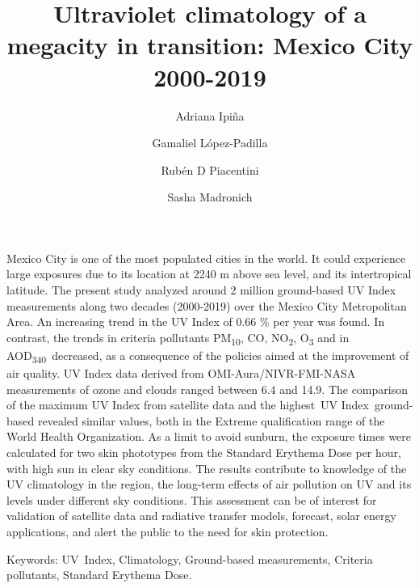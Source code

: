 \documentclass{article}
\renewenvironment{abstract}
  {{\bfseries\noindent{\abstractname}\par\nobreak}\footnotesize}
  {\bigskip}
\begin{document}
\title{Ultraviolet climatology of a megacity in transition: Mexico City 2000-2019}
\author[1]{Adriana Ipiña}%
\author[2]{Gamaliel López-Padilla}%
\author[1]{Rubén D Piacentini}%
\author[3]{Sasha Madronich}
%
\vspace{-1em}
\date{}
\begingroup
\let\center\flushleft
\let\endcenter\endflushleft
\maketitle
\endgroup
\linenumbers
{}
\begin{abstract}
  Mexico City is one of the most populated cities in the world. It could
  experience large exposures due to its location at 2240 m above sea
  level, and its intertropical latitude. The present study analyzed around
  2 million ground-based UV Index measurements along two decades
  (2000-2019) over the Mexico City Metropolitan Area. An increasing trend
  in the UV Index of 0.66 \% per year was found. In contrast, the trends
  in criteria pollutants PM\textsubscript{10}, CO, NO\textsubscript{2},
  O\textsubscript{3} and in AOD\textsubscript{340}~decreased, as a
  consequence of the policies aimed at the improvement of air quality. UV
  Index data derived from OMI-Aura/NIVR-FMI-NASA measurements of ozone and
  clouds ranged between 6.4 and 14.9. The comparison of the maximum UV
  Index from satellite data and the highest~UV Index~ground-based revealed
  similar values, both in the Extreme qualification range of the World
  Health Organization. As a limit to avoid sunburn, the exposure times
  were calculated for two skin phototypes from the Standard Erythema Dose
  per hour, with high sun in clear sky conditions. The results contribute
  to knowledge of the UV climatology in the region, the long-term effects
  of air pollution on UV and its levels under different sky conditions.
  This assessment can be of interest for validation of satellite data and
  radiative transfer models, forecast, solar energy applications, and
  alert the public to the need for skin protection.%
  \end{abstract}%



  Keywords: UV~Index, Climatology, Ground-based measurements, Criteria
  pollutants, Standard Erythema Dose.~~
\end{document}
